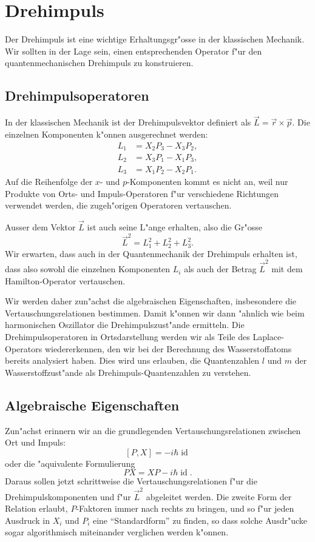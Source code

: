 \chapter{Drehimpuls\label{chapter:drehimpuls}}
\rhead{}
Der Drehimpuls ist eine wichtige Erhaltungsgr"osse in der klassischen
Mechanik. Wir sollten in der Lage sein, einen entsprechenden Operator
f"ur den quantenmechanischen Drehimpuls zu konstruieren.

%
%

\section{Drehimpulsoperatoren\label{section:drehimpulsoperatoren}}
In der klassischen Mechanik ist der Drehimpulsvektor definiert
als $\vec L=\vec r\times \vec p$. Die einzelnen Komponenten k"onnen
ausgerechnet werden:
\begin{align*}
L_1&=X_2P_3-X_3P_2,\\
L_2&=X_3P_1-X_1P_3,\\
L_3&=X_1P_2-X_2P_1.
\end{align*}
%
Auf die Reihenfolge der $x$- und $p$-Komponenten kommt es nicht an,
weil nur Produkte von Orts- und Impuls-Operatoren f"ur verschiedene
Richtungen verwendet werden, die zugeh"origen Operatoren vertauschen.

Ausser dem Vektor $\vec L$ ist auch seine L"ange erhalten, also
die Gr"osse
\[
\vec L^2=L_1^2+L_2^2+L_3^2.
\]
%
Wir erwarten, dass auch in der Quantenmechanik der Drehimpuls
erhalten ist, dass also sowohl die einzelnen Komponenten $L_i$ 
als auch der Betrag $\vec L^2$ mit dem Hamilton-Operator vertauschen.

Wir werden daher zun"achst die algebraischen Eigenschaften, insbesondere
die Vertauschungsrelationen bestimmen. Damit k"onnen wir dann "ahnlich
wie beim harmonischen Oszillator die Drehimpulszust"ande ermitteln.
Die Drehimpulsoperatoren in Ortsdarstellung werden wir als Teile
des Laplace-Operators wiedererkennen, den wir bei der Berechnung
des Wasserstoffatoms bereits analysiert haben. Dies wird uns erlauben,
die Quantenzahlen $l$ und $m$ der Wasserstoffzust"ande als
Drehimpuls-Quantenzahlen zu verstehen.

\section{Algebraische Eigenschaften\label{section:drehimpulsalgebra}}
Zun"achst erinnern wir an die grundlegenden Vertauschungsrelationen zwischen
Ort und Impuls:
\[
[P,X]=-i\hbar \operatorname{id}
\]
oder die "aquivalente Formulierung
\[
PX=XP-i\hbar \operatorname{id}.
\]
Daraus sollen jetzt schrittweise die Vertauschungsrelationen f"ur die
Drehimpulskomponenten und f"ur $\vec L^2$ abgeleitet werden.
Die zweite Form der Relation erlaubt, $P$-Faktoren immer nach rechts zu
bringen, und so f"ur jeden Ausdruck in $X_i$ und $P_i$ eine
``Standardform'' zu finden, so dass solche Ausdr"ucke sogar algorithmisch
miteinander verglichen werden k"onnen.

